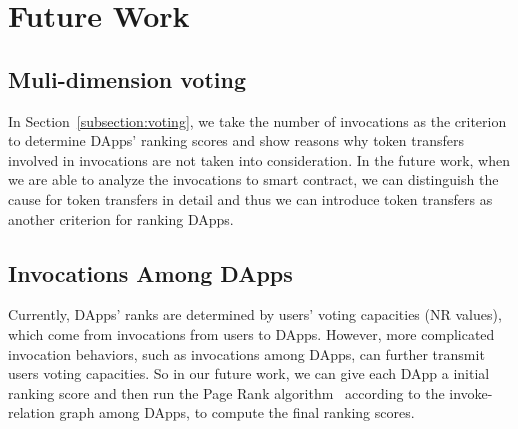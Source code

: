 \section{Future Work}
\subsection{Muli-dimension voting}
In Section~\ref{subsection:voting}, we take the number of invocations as the criterion to determine DApps' ranking scores and show reasons why token transfers involved in invocations are not taken into consideration. In the future work, when we are able to analyze the invocations to smart contract, we can  distinguish the cause for token transfers in detail and thus we can introduce token transfers as another criterion for ranking DApps.

\subsection{Invocations Among DApps}
Currently, DApps' ranks are determined by users' voting capacities (NR values), which come from invocations from users to DApps. However, more complicated invocation behaviors, such as invocations among DApps, can further transmit users voting capacities. So in our future work, we can give each DApp a initial ranking score and then run the Page Rank algorithm~\cite{page1999pagerank} according to the invoke-relation graph among DApps, to compute the final ranking scores.

